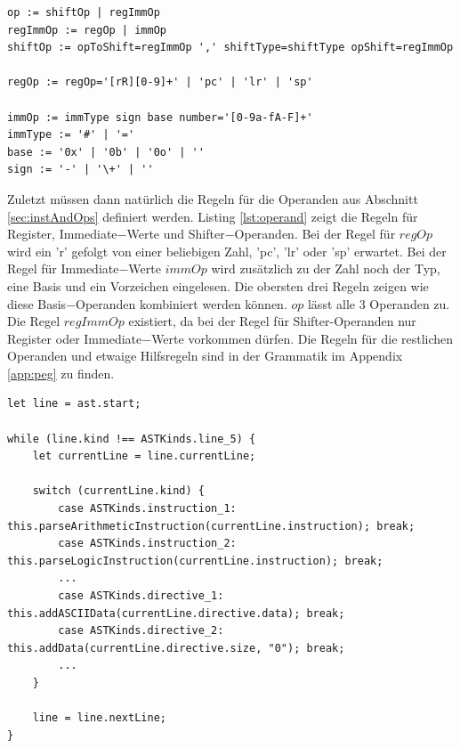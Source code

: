 \documentclass[a4paper, 11pt, onecolumn]{article}
\begin{document}
\begin{lstlisting}[basicstyle=\ttfamily\footnotesize, backgroundcolor=\color{backcolour}, caption={Operanden}, captionpos=b, label={lst:operand},float,floatplacement=H]
op := shiftOp | regImmOp
regImmOp := regOp | immOp
shiftOp := opToShift=regImmOp ',' shiftType=shiftType opShift=regImmOp

regOp := regOp='[rR][0-9]+' | 'pc' | 'lr' | 'sp'

immOp := immType sign base number='[0-9a-fA-F]+'
immType := '#' | '='
base := '0x' | '0b' | '0o' | ''
sign := '-' | '\+' | ''
\end{lstlisting}

Zuletzt müssen dann natürlich die Regeln für die Operanden aus Abschnitt \ref{sec:instAndOps} definiert werden. Listing \ref{lst:operand} zeigt die Regeln für Register, Immediate$-$Werte und Shifter$-$Operanden. Bei der Regel für $regOp$ wird ein 'r' gefolgt von einer beliebigen Zahl, 'pc', 'lr' oder 'sp' erwartet. Bei der Regel für Immediate$-$Werte $immOp$ wird zusätzlich zu der Zahl noch der Typ, eine Basis und ein Vorzeichen eingelesen. Die obersten drei Regeln zeigen wie diese Basis$-$Operanden kombiniert werden können. $op$ lässt alle 3 Operanden zu. Die Regel $regImmOp$ existiert, da bei der Regel für Shifter-Operanden nur Register oder Immediate$-$Werte vorkommen dürfen. Die Regeln für die restlichen Operanden und etwaige Hilfsregeln sind in der Grammatik im Appendix \ref{app:peg} zu finden.\\

\begin{lstlisting}[style=JavaScript, basicstyle=\footnotesize, backgroundcolor=\color{backcolour}, caption={Abarbeiten des abstrakten Syntaxbaumes in UserInputParser.ts}, captionpos=b, label={lst:userinputparser}]
let line = ast.start;

while (line.kind !== ASTKinds.line_5) {
    let currentLine = line.currentLine;

    switch (currentLine.kind) {
        case ASTKinds.instruction_1: this.parseArithmeticInstruction(currentLine.instruction); break;
        case ASTKinds.instruction_2: this.parseLogicInstruction(currentLine.instruction); break;
        ...
        case ASTKinds.directive_1: this.addASCIIData(currentLine.directive.data); break;
        case ASTKinds.directive_2: this.addData(currentLine.directive.size, "0"); break;
        ...
    }

    line = line.nextLine;
}
\end{lstlisting}
\end{document}
